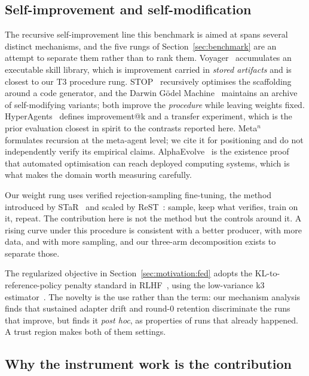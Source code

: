 \subsection{Self-improvement and self-modification}

The recursive self-improvement line this benchmark is aimed at spans several distinct mechanisms,
and the five rungs of Section~\ref{sec:benchmark} are an attempt to separate them rather than to
rank them. Voyager~\cite{voyager} accumulates an executable skill library, which is improvement
carried in \emph{stored artifacts} and is closest to our T3 procedure rung.
STOP~\cite{stop} recursively optimises the scaffolding around a code generator, and the Darwin
G\"odel Machine~\cite{dgm} maintains an archive of self-modifying variants; both improve the
\emph{procedure} while leaving weights fixed. HyperAgents~\cite{hyperagents} defines
improvement@k and a transfer experiment, which is the prior evaluation closest in spirit to the
contrasts reported here. Meta$^n$~\cite{metan} formulates recursion at the meta-agent level; we
cite it for positioning and do not independently verify its empirical claims.
AlphaEvolve~\cite{alphaevolve} is the existence proof that automated optimisation can reach
deployed computing systems, which is what makes the domain worth measuring carefully.

Our weight rung uses verified rejection-sampling fine-tuning, the method introduced by
STaR~\cite{zelikman2022star} and scaled by ReST~\cite{gulcehre2023rest}: sample, keep what
verifies, train on it, repeat. The contribution here is not the method but the controls around
it. A rising curve under this procedure is consistent with a better producer, with more data,
and with more sampling, and our three-arm decomposition exists to separate those.

The regularized objective in Section~\ref{sec:motivation:fed} adopts the KL-to-reference-policy
penalty standard in RLHF~\cite{ziegler2019klrlhf}, using the low-variance k3
estimator~\cite{schulman2020kl}. The novelty is the use rather than the term: our mechanism
analysis finds that sustained adapter drift and round-0 retention discriminate the runs that
improve, but finds it \emph{post hoc}, as properties of runs that already happened. A trust
region makes both of them settings.

\subsection{Why the instrument work is the contribution}

